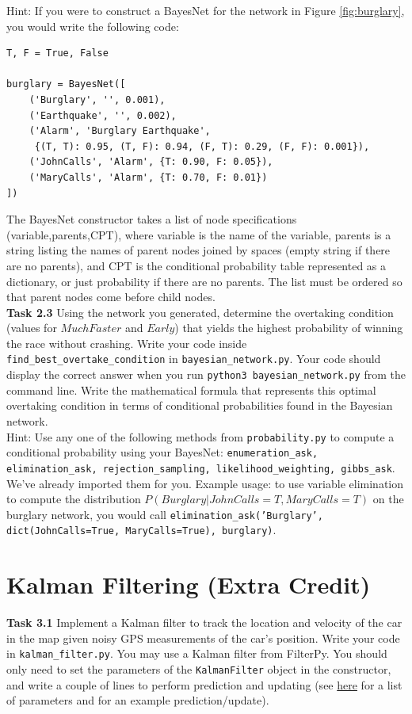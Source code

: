 \documentclass[a4paper]{article}
\theoremstyle{definition}
\theoremstyle{plain}
\begin{document}
\noindent
Hint: If you were to construct a BayesNet for the network in Figure \ref{fig:burglary}, you would write the following code:
\begin{verbatim}
T, F = True, False

burglary = BayesNet([
    ('Burglary', '', 0.001),
    ('Earthquake', '', 0.002),
    ('Alarm', 'Burglary Earthquake',
     {(T, T): 0.95, (T, F): 0.94, (F, T): 0.29, (F, F): 0.001}),
    ('JohnCalls', 'Alarm', {T: 0.90, F: 0.05}),
    ('MaryCalls', 'Alarm', {T: 0.70, F: 0.01})
])
\end{verbatim}
The BayesNet constructor takes a list of node specifications (variable,parents,CPT), where variable is the name of the variable, parents is a string listing the names of parent nodes joined by spaces (empty string if there are no parents), and CPT is the conditional probability table represented as a dictionary, or just probability if there are no parents. The list must be ordered so that parent nodes come before child nodes.\\

\noindent
\textbf{Task 2.3} Using the network you generated, determine the overtaking condition (values for $MuchFaster$ and $Early$) that yields the highest probability of winning the race without crashing. Write your code inside \texttt{find\_best\_overtake\_condition} in \texttt{bayesian\_network.py}. Your code should display the correct answer when you run \texttt{python3 bayesian\_network.py} from the command line. Write the mathematical formula that represents this optimal overtaking condition in terms of conditional probabilities found in the Bayesian network.\\

\noindent
Hint: Use any one of the following methods from \texttt{probability.py} to compute a conditional probability using your BayesNet: \texttt{enumeration\_ask, elimination\_ask, rejection\_sampling, likelihood\_weighting, gibbs\_ask}. We've already imported them for you. Example usage: to use variable elimination to compute the distribution $P(Burglary|JohnCalls=T,MaryCalls=T)$ on the burglary network, you would call \texttt{elimination\_ask('Burglary', dict(JohnCalls=True, MaryCalls=True), burglary)}.

\section{Kalman Filtering (Extra Credit)}

\noindent
\textbf{Task 3.1} Implement a Kalman filter to track the location and velocity of the car in the map given noisy GPS measurements of the car's position. Write your code in \texttt{kalman\_filter.py}. You may use a Kalman filter from FilterPy. You should only need to set the parameters of the \texttt{KalmanFilter} object in the constructor, and write a couple of lines to perform prediction and updating (see \href{https://filterpy.readthedocs.io/en/latest/kalman/KalmanFilter.html}{here} for a list of parameters and for an example prediction/update).\\
\end{document}
